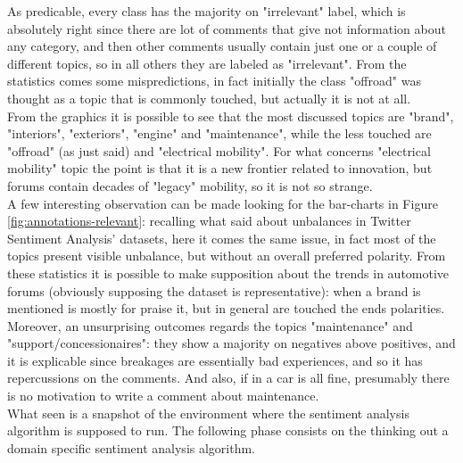 As predicable, every class has the majority on "irrelevant" label, which is absolutely right since there are lot of comments that give not information about any category, and then other comments usually contain just one or a couple of different topics, so in all others they are labeled as "irrelevant". From the statistics comes some mispredictions, in fact initially the class "offroad" was thought as a topic that is commonly touched, but actually it is not at all. \\
From the graphics it is possible to see that the most discussed topics are "brand", "interiors", "exteriors", "engine" and "maintenance", while the less touched are "offroad" (as just said) and "electrical mobility". For what concerns "electrical mobility" topic the point is that it is a new frontier related to innovation, but forums contain decades of "legacy" mobility, so it is not so strange.\\
A few interesting observation can be made looking for the bar-charts in Figure \ref{fig:annotations-relevant}: recalling what said about unbalances in Twitter Sentiment Analysis' datasets, here it comes the same issue, in fact most of the topics present visible unbalance, but without an overall preferred polarity. From these statistics it is possible to make supposition about the trends in automotive forums (obviously supposing the dataset is representative): when a brand is mentioned is mostly for praise it, but in general are touched the ends polarities. Moreover, an unsurprising outcomes regards the topics "maintenance" and "support/concessionaires": they show a majority on negatives above positives, and it is explicable since breakages are essentially bad experiences, and so it has repercussions on the comments. And also, if in a car is all fine, presumably there is no motivation to write a comment about maintenance.\\

What seen is a snapshot of the environment where the sentiment analysis algorithm is supposed to run. The following phase consists on the thinking out a domain specific sentiment analysis algorithm.





























